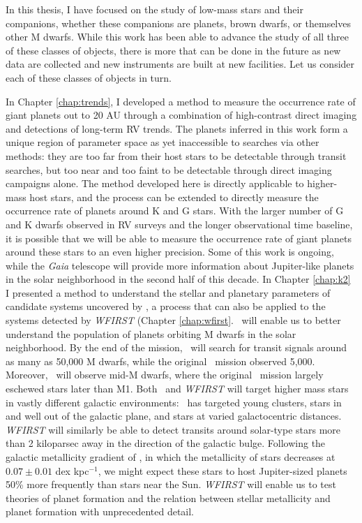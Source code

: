 In this thesis, I have focused on the study of low-mass stars and their companions,
whether these companions are planets, brown dwarfs, or themselves other M dwarfs.
While this work has been able to advance the study of all three of these classes of
objects, there is more that can be done in the future as new data are collected and new
instruments are built at new facilities.
Let us consider each of these classes of objects in turn.

In Chapter \ref{chap:trends}, I developed a method to measure the occurrence rate of giant
planets out to 20 AU through a combination of high-contrast direct imaging and 
detections of long-term RV trends.
The planets inferred in this work form a unique region of parameter space as yet 
inaccessible to searches via other methods:
they are too far from their host stars to be detectable through transit searches,
but too near and too faint to be detectable through direct imaging campaigns alone.
The method developed here is directly applicable to higher-mass host stars, and the
process can be extended to directly measure the occurrence rate of planets around K and G
stars.
With the larger number of G and K dwarfs observed in RV surveys and the longer observational
time baseline, it is possible that we will be able to measure the occurrence rate of 
giant planets around these stars to an even higher precision.
Some of this work is ongoing, while the \textit{Gaia} telescope will provide more  information about Jupiter-like planets in the solar neighborhood in the second half of
this decade.
In Chapter \ref{chap:k2} I presented a method to understand the stellar and planetary parameters of candidate systems uncovered by \KT, a process that can also be applied to the systems detected by \textit{WFIRST} (Chapter \ref{chap:wfirst}. 
\KT\ will enable us to better understand the population of planets orbiting M dwarfs 
in the solar neighborhood. 
By the end of the mission, \KT\ will search for transit signals
around as many as 50,000 M dwarfs, while the original \kep\ mission observed 5,000.
Moreover, \KT\ will observe mid-M dwarfs, where the original \kep\ mission largely eschewed
stars later than M1.
Both \KT\ and \textit{WFIRST} will target higher mass stars in vastly different galactic
environments: \KT\ has targeted young clusters, stars in and well out of the galactic 
plane, and stars at varied galactocentric distances.
\textit{WFIRST} will similarly be able to detect transits around solar-type stars
more than 2 kiloparsec away in the direction of the galactic bulge. 
Following the galactic metallicity gradient of \citep{Rolleston00}, in which the 
metallicity of stars decreases at $0.07 \pm 0.01$ dex kpc$^{-1}$, we might expect
these stars to host Jupiter-sized planets 50\% more frequently than stars
near the Sun.
\textit{WFIRST} will enable us to test theories of planet formation and the relation
between stellar metallicity and planet formation with unprecedented detail.

